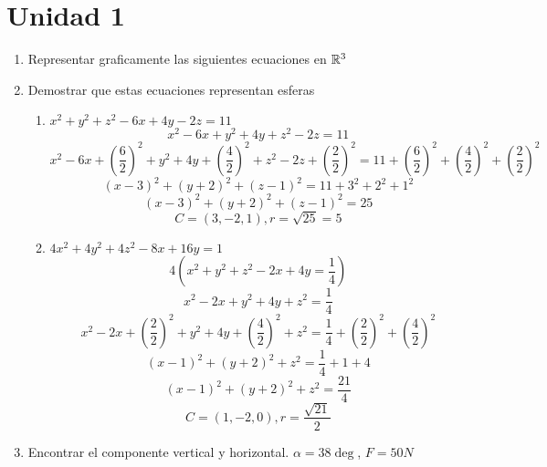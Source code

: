 \documentclass[../practica.root.tex]{subfiles}
\begin{document}
\section{Unidad 1}
\begin{enumerate}
    \item Representar graficamente las siguientes ecuaciones en $\mathbb{R}^3$

    \item Demostrar que estas ecuaciones representan esferas

          \begin{enumerate}
              \item $x^2 + y^2 + z^2 - 6x + 4y - 2z = 11$
                    \[ x^2 - 6x + y^2 + 4y + z^2 - 2z = 11 \]
                    \[
                        x^2 - 6x + \left(\frac{6}{2}\right)^2
                        + y^2 + 4y + \left(\frac{4}{2}\right)^2
                        + z^2 - 2z + \left(\frac{2}{2}\right)^2
                        = 11
                        + \left(\frac{6}{2}\right)^2
                        + \left(\frac{4}{2}\right)^2
                        + \left(\frac{2}{2}\right)^2
                    \] \[
                        (x - 3)^2 + (y + 2)^2 + (z - 1)^2 = 11 + 3^2 + 2^2 + 1^2
                    \] \[
                        (x - 3)^2 + (y + 2)^2 + (z - 1)^2 = 25
                    \] \[
                        \boxed{C = (3,-2,1), r = \sqrt{25} = 5}
                    \]

              \item $4x^2 + 4y^2 + 4z^2 - 8x + 16y = 1$
                    \[ 4\left(x^2 + y^2 + z^2 - 2x + 4y = \frac{1}{4}\right) \]
                    \[ x^2 - 2x + y^2 + 4y + z^2 = \frac{1}{4} \]
                    \[
                        x^2 - 2x + \left(\frac{2}{2}\right)^2
                        + y^2 + 4y + \left(\frac{4}{2}\right)^2
                        + z^2
                        = \frac{1}{4}
                        + \left(\frac{2}{2}\right)^2
                        + \left(\frac{4}{2}\right)^2
                    \] \[
                        (x - 1)^2 + (y + 2)^2 + z^2 = \frac{1}{4} + 1 + 4
                    \] \[
                        (x - 1)^2 + (y + 2)^2 + z^2 = \frac{21}{4}
                    \] \[
                        \boxed{C = (1, -2, 0), r = \frac{\sqrt{21}}{2}}
                    \]
          \end{enumerate}

    \item Encontrar el componente vertical y horizontal. $\alpha = 38\deg$, $F = 50N$


\end{enumerate}
\end{document}

